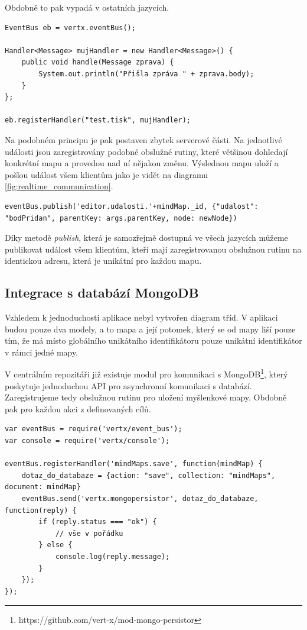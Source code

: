 Obdobně to pak vypadá v ostatních jazycích. 

\begin{lstlisting}[caption=Zaregistrování obslužné rutiny v jazyce Java]
EventBus eb = vertx.eventBus();

Handler<Message> mujHandler = new Handler<Message>() {
    public void handle(Message zprava) {
        System.out.println("Přišla zpráva " + zprava.body);
    }
};

eb.registerHandler("test.tisk", mujHandler);
\end{lstlisting}

Na podobném principu je pak postaven zbytek serverové části. Na jednotlivé události jsou zaregistrovány podobné obslužné rutiny, které většinou dohledají konkrétní mapu a provedou nad ní nějakou změnu. Výslednou mapu uloží a pošlou událost všem klientům jako je vidět na diagramu \ref{fig:realtime_communication}.

\begin{lstlisting}[caption=Publikování zprávy v jazyce JavaScript]
eventBus.publish('editor.udalosti.'+mindMap._id, {"udalost": "bodPridan", parentKey: args.parentKey, node: newNode})
\end{lstlisting}

Díky metodě \emph{publish}, která je samozřejmě dostupná ve všech jazycích můžeme publikovat událost všem klientům, kteří mají zaregistrovanou obslužnou rutinu na identickou adresu, která je unikátní pro každou mapu.

\vspace{0.5cm} %

\subsection{Integrace s databází MongoDB}

Vzhledem k jednoduchosti aplikace nebyl vytvořen diagram tříd. V aplikaci budou pouze dva modely, a to mapa a její potomek, který se od mapy liší pouze tím, že má místo globálního unikátního identifikátoru pouze unikátní identifikátor v rámci jedné mapy.

V centrálním repozitáři již existuje modul pro komunikaci s MongoDB\footnote{https://github.com/vert-x/mod-mongo-persistor}, který poskytuje jednoduchou API pro asynchronní komunikaci s databází. Zaregistrujeme tedy obslužnou rutinu pro uložení myšlenkové mapy. Obdobně pak pro každou akci z definovaných cílů.

\begin{lstlisting}[caption=Uložení myšlenkové mapy do databáze]
var eventBus = require('vertx/event_bus');
var console = require('vertx/console');

eventBus.registerHandler('mindMaps.save', function(mindMap) {
	dotaz_do_databaze = {action: "save", collection: "mindMaps", document: mindMap}
	eventBus.send('vertx.mongopersistor', dotaz_do_databaze, function(reply) {
		if (reply.status === "ok") {
			// vše v pořádku
		} else {
			console.log(reply.message);
		}
	});
});

\end{lstlisting}

